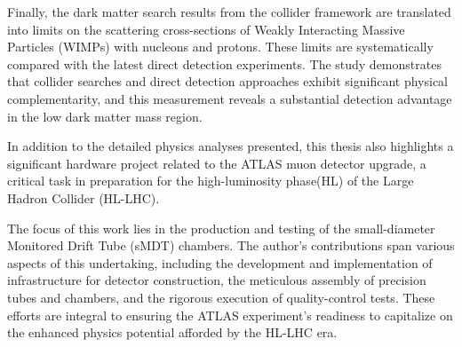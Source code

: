\begin{abstract*}
Finally, the dark matter search results from the collider framework are translated into limits on the scattering cross-sections of Weakly Interacting Massive Particles (WIMPs) with nucleons and protons. These limits are systematically compared with the latest direct detection experiments. The study demonstrates that collider searches and direct detection approaches exhibit significant physical complementarity, and this measurement reveals a substantial detection advantage in the low dark matter mass region.

In addition to the detailed physics analyses presented, this thesis also highlights a significant hardware project related to the ATLAS muon detector upgrade, a critical task in preparation for the high-luminosity phase(HL) of the Large Hadron Collider (HL-LHC). 

The focus of this work lies in the production and testing of the small-diameter Monitored Drift Tube (sMDT) chambers. The author's contributions span various aspects of this undertaking, including the development and implementation of infrastructure for detector construction, the meticulous assembly of precision tubes and chambers, and the rigorous execution of quality-control tests. These efforts are integral to ensuring the ATLAS experiment's readiness to capitalize on the enhanced physics potential afforded by the HL-LHC era.



%



\end{abstract*}
